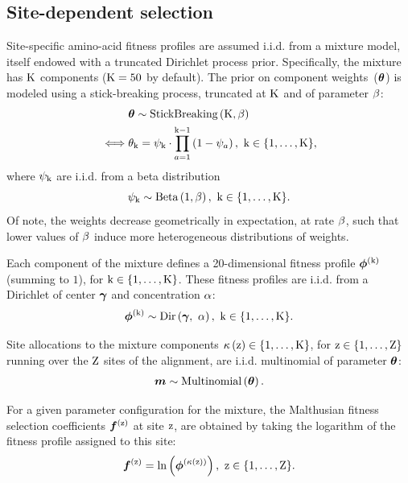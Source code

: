 \documentclass{MBE}
\begin{document}
	\subsection{Site-dependent selection}
	\label{sec:profiles}
	Site-specific amino-acid fitness profiles are assumed i.i.d. from a mixture model, itself endowed with a truncated Dirichlet process prior.
	Specifically, the mixture has $\text{K}$ components ($\text{K} = 50$ by default).
	The prior on component weights~($\bm{\theta}$) is modeled using a stick-breaking process, truncated at $\text{K}$ and of parameter $\beta$:
	\begin{align}
		\label{eq:DistribStickBreaking}
		\begin{split}
			& \StickBreaking \sim \text{StickBreaking}\left( \Ncat, \stickbreakinghyper \right)\\
			\iff & \stickbreaking_{\cat} = \stick_{\cat}\cdot \prod _{{\indice=1}}^{{\cat-1}}\left(1-\stick_{\indice}\right),\ \Setcat,
		\end{split}
	\end{align}
	where $\psi_{\text{k}}$ are i.i.d. from a beta distribution
	\begin{equation}
		\label{eq:Beta}
		\stick_{\cat} \sim \text{Beta}\left( 1, \stickbreakinghyper \right),\ \Setcat.
	\end{equation}
	Of note, the weights decrease geometrically in expectation, at rate $\beta$, such that lower values of $\beta$ induce more heterogeneous distributions of weights.

	Each component of the mixture defines a 20-dimensional fitness profile $\bm{\phi}^{(\text{k})}$ (summing to $1$), for $ \text{k} \in \{1, \hdots, \text{K}\}$.
	These fitness profiles are i.i.d. from a Dirichlet of center $\bm{\gamma}$ and concentration $\alpha$:
	\begin{equation}
		\label{eq:DistribBase}
		\Profile\catexp \sim \text{Dir}\left( \centerProfile,\ \concentrationProfile \right),\ \Setcat.
	\end{equation}

	Site allocations to the mixture components $\kappa\left(\text{z}\right) \in \{1, \hdots, \text{K}\} $, for $\text{z} \in \{1, \hdots, \text{Z}\}$ running over the $\text{Z}$ sites of the alignment, are i.i.d. multinomial of parameter $\bm{\theta}$:
	\begin{align}
		\label{eq:DistribMultinomial}
		\catMultiVar \sim \text{Multinomial}\left( \StickBreaking \right).
	\end{align}

	For a given parameter configuration for the mixture, the Malthusian fitness selection coefficients $\bm{f}^{(\text{z})}$ at site $\text{z}$, are obtained by taking the logarithm of the fitness profile assigned to this site:
	\begin{equation}
		\label{eq:sitefitness}
		\Fit\siteexp = \ln \left( \Profile^{\left( \catsite \right)} \right),\ \Setsite.
	\end{equation}
\end{document}
